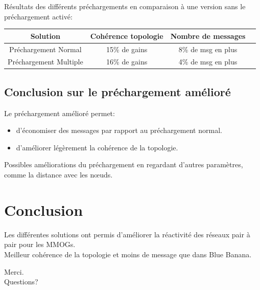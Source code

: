 \documentclass{beamer}
\begin{document}
  \begin{frame}
	 Résultats des différents préchargements en comparaison à une version sans le préchargement activé:
        \begin{table}[!h]
                \begin{center}
                \begin{tabular}{|c|c|c|c|}
                \hline
                Solution & Cohérence topologie & Nombre de messages \\
                \hline
                Préchargement Normal & 15\% de gains &  8\% de msg en plus\\
                Préchargement Multiple & 16\% de gains &  4\% de msg en plus\\
                \hline
                \end{tabular}
                \end{center}
                \label{tab:config1}
        \end{table}
  \end{frame}

  \subsection{Conclusion sur le préchargement amélioré}
  \begin{frame}
	Le préchargement amélioré permet:
	\begin{itemize}
		\item d'économiser des messages par rapport au préchargement normal.\\
		\item d'améliorer légèrement la cohérence de la topologie.\\
	\end{itemize}
	\vspace{5mm}
	Possibles améliorations du préchargement en regardant d'autres paramètres, comme la distance avec les nœuds.
  \end{frame}
	
  
  \section{Conclusion}
  \begin{frame}
	Les différentes solutions ont permis d'améliorer la réactivité des réseaux pair à pair pour les MMOGs.\\
	Meilleur cohérence de la topologie et moins de message que dans Blue Banana.
  \end{frame}
	

  \begin{frame}
	\begin{center}
	Merci.\\
	\vspace{1cm}	
	Questions?
	\end{center}
  \end{frame}  

  
\end{document}
